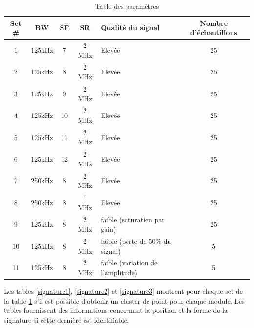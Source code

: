 \begin{table}[h]
\centering
\begin{tabular}{|c|c|c|c|p{3cm}|c|}
\hline
Set \# & BW & SF & SR & Qualité du signal & Nombre d'échantillons\\
\hline
1  & 125kHz & 7 & 2 MHz & Elevée & 25\\
\hline
2  & 125kHz & 8 & 2 MHz & Elevée & 25\\
\hline
3  & 125kHz & 9 & 2 MHz & Elevée & 25\\
\hline
4  & 125kHz & 10 & 2 MHz & Elevée & 25\\
\hline
5  & 125kHz & 11 & 2 MHz & Elevée & 25\\
\hline
6  & 125kHz & 12 & 2 MHz & Elevée & 25\\
\hline
7  & 250kHz & 8 & 2 MHz & Elevée & 25\\
\hline
8  & 250kHz & 8 & 1 MHz & Elevée & 25\\
\hline
9  &  125kHz & 8 & 2 MHz & faible (saturation par gain) & 25\\
\hline
10  & 125kHz & 8 & 2 MHz & faible (perte de 50\% du signal) & 5\\
\hline
11  & 125kHz & 8 & 2 MHz & faible (variation de l'amplitude) & 5\\
\hline
\end{tabular}
\caption{Table des paramètres}
\label{set}
\end{table}

Les tables \ref{signature1}, \ref{signature2} et \ref{signature3} montrent pour chaque set de la table \ref{set} s'il est possible d'obtenir un cluster de point pour chaque module. Les tables fournissent des informations concernant la position et la forme de la signature si cette dernière est identifiable.

\newpage

